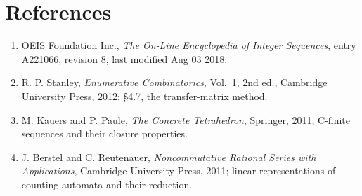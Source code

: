 \documentclass[11pt]{article}
\theoremstyle{definition}
\begin{document}
\section{References}

\begin{enumerate}

\item OEIS Foundation Inc., \emph{The On-Line Encyclopedia of Integer Sequences}, entry \href{https://oeis.org/A221066}{A221066}, revision 8, last modified Aug 03 2018.

\item R. P. Stanley, \emph{Enumerative Combinatorics}, Vol.~1, 2nd ed., Cambridge University Press, 2012; \S4.7, the transfer-matrix method.

\item M. Kauers and P. Paule, \emph{The Concrete Tetrahedron}, Springer, 2011; C-finite sequences and their closure properties.

\item J. Berstel and C. Reutenauer, \emph{Noncommutative Rational Series with Applications}, Cambridge University Press, 2011; linear representations of counting automata and their reduction.

\end{enumerate}
\end{document}
